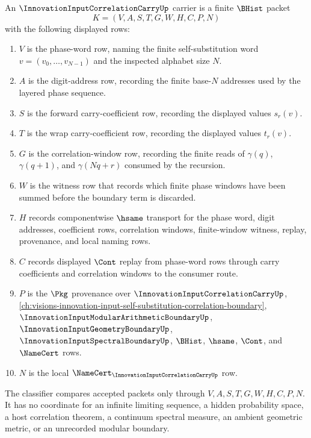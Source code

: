\begin{definition}
\label{def:innovation-input-correlation-carry-carrier}
An $\InnovationInputCorrelationCarryUp$ carrier is a finite $\BHist$ packet
$$
K=(V,A,S,T,G,W,H,C,P,N)
$$
with the following displayed rows:
\begin{enumerate}
\item $V$ is the phase-word row, naming the finite self-substitution word $v=(v_0,\ldots,v_{N-1})$ and the inspected alphabet size $N$.
\item $A$ is the digit-address row, recording the finite base-$N$ addresses used by the layered phase sequence.
\item $S$ is the forward carry-coefficient row, recording the displayed values $s_r(v)$.
\item $T$ is the wrap carry-coefficient row, recording the displayed values $t_r(v)$.
\item $G$ is the correlation-window row, recording the finite reads of $\gamma(q)$, $\gamma(q+1)$, and $\gamma(Nq+r)$ consumed by the recursion.
\item $W$ is the witness row that records which finite phase windows have been summed before the boundary term is discarded.
\item $H$ records componentwise $\hsame$ transport for the phase word, digit addresses, coefficient rows, correlation windows, finite-window witness, replay, provenance, and local naming rows.
\item $C$ records displayed $\Cont$ replay from phase-word rows through carry coefficients and correlation windows to the consumer route.
\item $P$ is the $\Pkg$ provenance over $\InnovationInputCorrelationCarryUp$, \autoref{ch:visions-innovation-input-self-substitution-correlation-boundary}, $\InnovationInputModularArithmeticBoundaryUp$, $\InnovationInputGeometryBoundaryUp$, $\InnovationInputSpectralBoundaryUp$, $\BHist$, $\hsame$, $\Cont$, and $\NameCert$ rows.
\item $N$ is the local $\NameCert_{\InnovationInputCorrelationCarryUp}$ row.
\end{enumerate}
The classifier compares accepted packets only through $V,A,S,T,G,W,H,C,P,N$. It has no coordinate for an infinite limiting sequence, a hidden probability space, a host correlation theorem, a continuum spectral measure, an ambient geometric metric, or an unrecorded modular boundary.
\end{definition}

